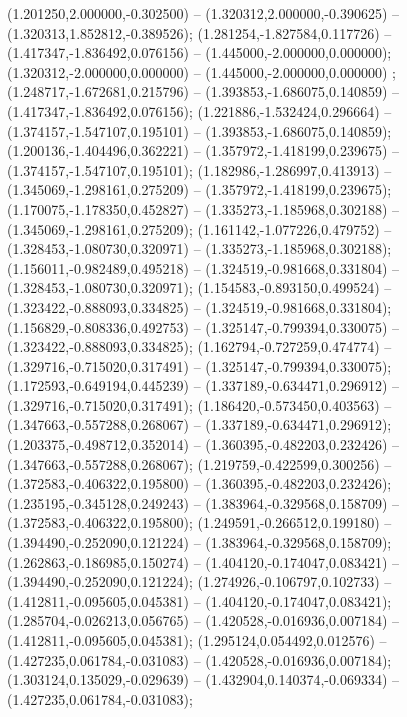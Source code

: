  (1.201250,2.000000,-0.302500) -- (1.320312,2.000000,-0.390625) -- (1.320313,1.852812,-0.389526);
 (1.281254,-1.827584,0.117726) -- (1.417347,-1.836492,0.076156) -- (1.445000,-2.000000,0.000000);
 (1.320312,-2.000000,0.000000) -- (1.445000,-2.000000,0.000000) ;
 (1.248717,-1.672681,0.215796) -- (1.393853,-1.686075,0.140859) -- (1.417347,-1.836492,0.076156);
 (1.221886,-1.532424,0.296664) -- (1.374157,-1.547107,0.195101) -- (1.393853,-1.686075,0.140859);
 (1.200136,-1.404496,0.362221) -- (1.357972,-1.418199,0.239675) -- (1.374157,-1.547107,0.195101);
 (1.182986,-1.286997,0.413913) -- (1.345069,-1.298161,0.275209) -- (1.357972,-1.418199,0.239675);
 (1.170075,-1.178350,0.452827) -- (1.335273,-1.185968,0.302188) -- (1.345069,-1.298161,0.275209);
 (1.161142,-1.077226,0.479752) -- (1.328453,-1.080730,0.320971) -- (1.335273,-1.185968,0.302188);
 (1.156011,-0.982489,0.495218) -- (1.324519,-0.981668,0.331804) -- (1.328453,-1.080730,0.320971);
 (1.154583,-0.893150,0.499524) -- (1.323422,-0.888093,0.334825) -- (1.324519,-0.981668,0.331804);
 (1.156829,-0.808336,0.492753) -- (1.325147,-0.799394,0.330075) -- (1.323422,-0.888093,0.334825);
 (1.162794,-0.727259,0.474774) -- (1.329716,-0.715020,0.317491) -- (1.325147,-0.799394,0.330075);
 (1.172593,-0.649194,0.445239) -- (1.337189,-0.634471,0.296912) -- (1.329716,-0.715020,0.317491);
 (1.186420,-0.573450,0.403563) -- (1.347663,-0.557288,0.268067) -- (1.337189,-0.634471,0.296912);
 (1.203375,-0.498712,0.352014) -- (1.360395,-0.482203,0.232426) -- (1.347663,-0.557288,0.268067);
 (1.219759,-0.422599,0.300256) -- (1.372583,-0.406322,0.195800) -- (1.360395,-0.482203,0.232426);
 (1.235195,-0.345128,0.249243) -- (1.383964,-0.329568,0.158709) -- (1.372583,-0.406322,0.195800);
 (1.249591,-0.266512,0.199180) -- (1.394490,-0.252090,0.121224) -- (1.383964,-0.329568,0.158709);
 (1.262863,-0.186985,0.150274) -- (1.404120,-0.174047,0.083421) -- (1.394490,-0.252090,0.121224);
 (1.274926,-0.106797,0.102733) -- (1.412811,-0.095605,0.045381) -- (1.404120,-0.174047,0.083421);
 (1.285704,-0.026213,0.056765) -- (1.420528,-0.016936,0.007184) -- (1.412811,-0.095605,0.045381);
 (1.295124,0.054492,0.012576) -- (1.427235,0.061784,-0.031083) -- (1.420528,-0.016936,0.007184);
 (1.303124,0.135029,-0.029639) -- (1.432904,0.140374,-0.069334) -- (1.427235,0.061784,-0.031083);
